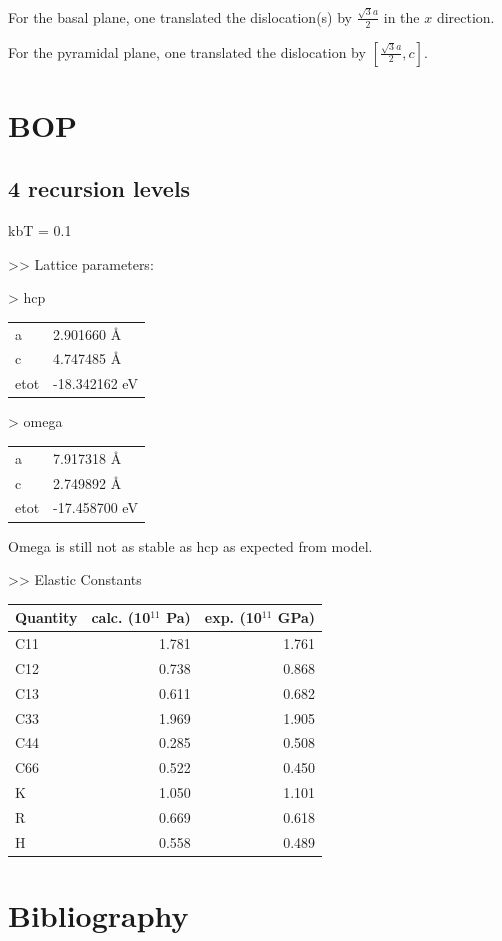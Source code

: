 \documentclass[11pt]{article}
\begin{document}
For the basal plane, one translated the dislocation(s) by
\(\frac{\sqrt{3}a}{2}\) in the \(x\) direction. 

For the pyramidal plane, one translated the dislocation by
\([\frac{\sqrt{3}a}{2}, c]\).




\section{BOP}
\label{sec:org02a8f55}

\subsection{4 recursion levels}
\label{sec:orgc212f1e}

kbT = 0.1

>> Lattice parameters:

> hcp
\begin{center}
\begin{tabular}{ll}
a & 2.901660  \AA{}\\
c & 4.747485  \AA{}\\
etot & -18.342162  eV\\
\end{tabular}
\end{center}

> omega
\begin{center}
\begin{tabular}{ll}
a & 7.917318  \AA{}\\
c & 2.749892 \AA{}\\
etot & -17.458700 eV\\
\end{tabular}
\end{center}

Omega is still not as stable as hcp as expected from model. 


>> Elastic Constants

\begin{center}
\begin{tabular}{lrr}
Quantity & calc. (10\(^{\text{11}}\) Pa) & exp. (10\(^{\text{11}}\) GPa)\\
\hline
C11 & 1.781 & 1.761\\
C12 & 0.738 & 0.868\\
C13 & 0.611 & 0.682\\
C33 & 1.969 & 1.905\\
C44 & 0.285 & 0.508\\
C66 & 0.522 & 0.450\\
K & 1.050 & 1.101\\
R & 0.669 & 0.618\\
H & 0.558 & 0.489\\
\end{tabular}
\end{center}

\section{Bibliography}
\label{sec:orgbdb0d34}
\label{orgded9f91}



\end{document}
